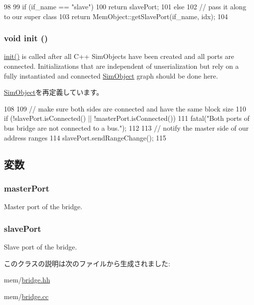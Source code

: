 \begin{DoxyCode}
98 {
99     if (if_name == "slave")
100         return slavePort;
101     else
102         // pass it along to our super class
103         return MemObject::getSlavePort(if_name, idx);
104 }
\end{DoxyCode}
\hypertarget{classBridge_a02fd73d861ef2e4aabb38c0c9ff82947}{
\subsubsection[{init}]{\setlength{\rightskip}{0pt plus 5cm}void init ()}}
\label{classBridge_a02fd73d861ef2e4aabb38c0c9ff82947}
\hyperlink{classBridge_a02fd73d861ef2e4aabb38c0c9ff82947}{init()} is called after all C++ SimObjects have been created and all ports are connected. Initializations that are independent of unserialization but rely on a fully instantiated and connected \hyperlink{classSimObject}{SimObject} graph should be done here. 

\hyperlink{classSimObject_a02fd73d861ef2e4aabb38c0c9ff82947}{SimObject}を再定義しています。


\begin{DoxyCode}
108 {
109     // make sure both sides are connected and have the same block size
110     if (!slavePort.isConnected() || !masterPort.isConnected())
111         fatal("Both ports of bus bridge are not connected to a bus.\n");
112 
113     // notify the master side  of our address ranges
114     slavePort.sendRangeChange();
115 }
\end{DoxyCode}


\subsection{変数}
\hypertarget{classBridge_a4ab26988f47c3d65c5f1b16488742580}{
\subsubsection[{masterPort}]{ {\bf masterPort}}}
\label{classBridge_a4ab26988f47c3d65c5f1b16488742580}
Master port of the bridge. \hypertarget{classBridge_a6cd5ac4c156de16d290c21f566968ac4}{
\subsubsection[{slavePort}]{ {\bf slavePort}}}
\label{classBridge_a6cd5ac4c156de16d290c21f566968ac4}
Slave port of the bridge. 

このクラスの説明は次のファイルから生成されました:\begin{DoxyCompactItemize}
\item 
mem/\hyperlink{bridge_8hh}{bridge.hh}\item 
mem/\hyperlink{bridge_8cc}{bridge.cc}\end{DoxyCompactItemize}
